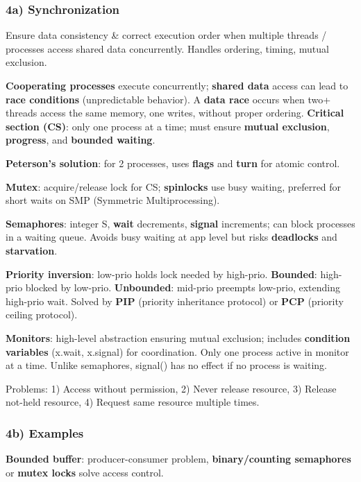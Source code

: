 \subsubsection*{4a) Synchronization}

Ensure data consistency \& correct execution order when multiple threads / processes access shared data concurrently. Handles ordering, timing, mutual exclusion.

\textbf{Cooperating processes} execute concurrently; \textbf{shared data} access can lead to \textbf{race conditions} (unpredictable behavior). A \textbf{data race} occurs when two+ threads access the same memory, one writes, without proper ordering. \textbf{Critical section (CS)}: only one process at a time; must ensure \textbf{mutual exclusion}, \textbf{progress}, and \textbf{bounded waiting}.  

\textbf{Peterson's solution}: for 2 processes, uses \textbf{flags} and \textbf{turn} for atomic control.

\textbf{Mutex}: acquire/release lock for CS; \textbf{spinlocks} use busy waiting, preferred for short waits on SMP (Symmetric Multiprocessing).

\textbf{Semaphores}: integer S, \textbf{wait} decrements, \textbf{signal} increments; can block processes in a waiting queue. Avoids busy waiting at app level but risks \textbf{deadlocks} and \textbf{starvation}.

\textbf{Priority inversion}: low-prio holds lock needed by high-prio. 
\textbf{Bounded}: high-prio blocked by low-prio.
\textbf{Unbounded}: mid-prio preempts low-prio, extending high-prio wait. Solved by \textbf{PIP} (priority inheritance protocol) or \textbf{PCP} (priority ceiling protocol).

\textbf{Monitors}: high-level abstraction ensuring mutual exclusion; includes \textbf{condition variables} (x.wait, x.signal) for coordination.
Only one process active in monitor at a time.
Unlike semaphores, signal() has no effect if no process is waiting. 

Problems: 1) Access without permission, 2) Never release resource, 3) Release not-held resource, 4) Request same resource multiple times.


\subsubsection*{4b) Examples}
\textbf{Bounded buffer}: producer-consumer problem, \textbf{binary/counting semaphores} or \textbf{mutex locks} solve access control.

